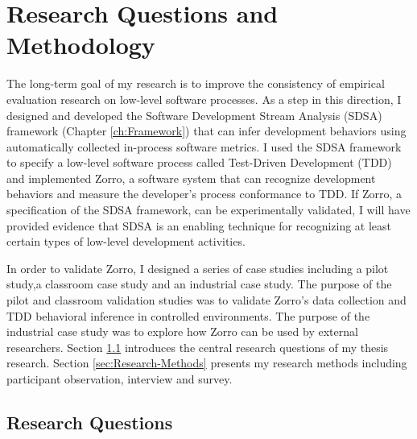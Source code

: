 \chapter{Research Questions and Methodology}
\label{ch:Research}
The long-term goal of my research is to improve the consistency of empirical evaluation research on low-level software processes. As a step in this direction, I designed and developed the Software Development Stream Analysis (SDSA) framework (Chapter \ref{ch:Framework}) that can infer development behaviors using automatically collected in-process software metrics. I used the SDSA framework to specify a low-level software process called Test-Driven Development (TDD) and implemented Zorro, a software system that can recognize development behaviors and measure the developer's process conformance to TDD. If Zorro, a specification of the SDSA framework, can be experimentally validated, I will have provided evidence that SDSA is an enabling technique for recognizing at least certain types of low-level development activities. 

In order to validate Zorro, I designed a series of case studies including a pilot study,a classroom case study and an industrial case study. The purpose of the pilot and classroom validation studies was to validate Zorro's data collection and TDD behavioral inference 
in controlled environments. The purpose of the industrial case study was to explore how Zorro can be used by external researchers. Section \ref{sec:Research-Questions} introduces the central research questions of my thesis research. Section \ref{sec:Research-Methods} presents my research methods including participant observation, interview and survey. 

\section{Research Questions}
\label{sec:Research-Questions}

